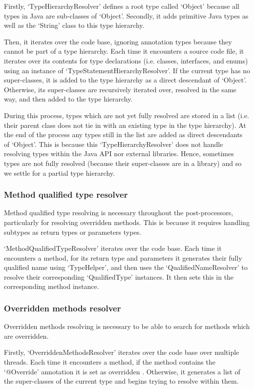 \documentclass[12pt, letterpaper]{article}
\begin{document}
Firstly, `TypeHierarchyResolver' defines a root type called `Object' because all types in Java are sub-classes of `Object'.
Secondly, it adds primitive Java types as well as the `String' class to this type hierarchy.

Then, it iterates over the code base, ignoring annotation types because they cannot be part of a type hierarchy.
Each time it encounters a source code file, it iterates over its contents for type declarations (i.e. classes, interfaces, and enums) using an instance of `TypeStatementHierarchyResolver'.
If the current type has no super-classes, it is added to the type hierarchy as a direct descendant of `Object'.
Otherwise, its super-classes are recursively iterated over, resolved in the same way, and then added to the type hierarchy.

During this process, types which are not yet fully resolved are stored in a list (i.e. their parent class does not tie in with an existing type in the type hierarchy).
At the end of the process any types still in the list are added as direct descendants of `Object'.
This is because this `TypeHierarchyResolver' does not handle resolving types within the Java API nor external libraries.
Hence, sometimes types are not fully resolved (because their super-classes are in a library) and so we settle for a partial type hierarchy.

\subsubsection{Method qualified type resolver}
Method qualified type resolving is necessary throughout the post-processors, particularly for resolving overridden methods.
This is because it requires handling subtypes as return types or parameters types.

`MethodQualifiedTypeResolver' iterates over the code base.
Each time it encounters a method, for its return type and parameters it generates their fully qualified name using `TypeHelper', and then uses the `QualifiedNameResolver' to resolve their corresponding `QualifiedType' instances.
It then sets this in the corresponding method instance.

\subsubsection{Overridden methods resolver}
Overridden methods resolving is necessary to be able to search for methods which are overridden.

Firstly, `OverriddenMethodsResolver' iterates over the code base over multiple threads.
Each time it encounters a method, if the method contains the `@Override' annotation it is set as overridden \autocite{overriddenannotation}.
Otherwise, it generates a list of the super-classes of the current type and begins trying to resolve within them.
\end{document}
